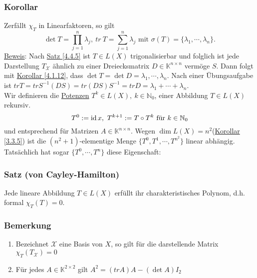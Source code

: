 \subsubsection{Korollar}
Zerfällt $\chi _T$ in Linearfaktoren, so gilt
\[\det T=\prod _{j=1}^n \lambda _j,\ tr\ T=\sum _{j=1}^n \lambda _j\text{ mit }\sigma (T)=\{\lambda _1,\cdots ,\lambda _n\}.\]
\underline{Beweis}:  Nach \hyperref[4.4.5]{Satz \ref{4.4.5}} ist $T\in L(X)$ trigonalisierbar und folglich ist jede Darstellung $T_\mathcal{X}$ ähnlich zu einer Dreiecksmatrix $D\in \mathbb{K}^{n\times n}$ vermöge $S$.  Dann folgt mit \hyperref[4.1.12]{Korollar \ref{4.1.12}}, dass $\det T=\det D=\lambda _1,\cdots ,\lambda _n$.  Nach einer Übungsaufgabe ist $trT=trS^{-1}(DS)=tr(DS)S^{-1}=trD=\lambda _1+\cdots +\lambda _n$.\\
Wir definieren die \underline{Potenzen} $T^k\in L(X),\ k\in\mathbb{N}_0$, einer Abbildung $T\in L(X)$ rekursiv.
\[T^0:=\operatorname{id} x,\ T^{k+1}:=T\circ T^k\text{ für }k\in\mathbb{N}_0\]
und entsprechend für Matrizen $A\in \mathbb{K}^{n\times n}$.  Wegen $\dim L(X)=n^2$(\hyperref[3.3.5]{Korollar \ref{3.3.5}}) ist die $(n^2+1)$-elementige Menge $\{T^0, T^1,\cdots ,T^{n^2}\}$ linear abhängig.  Tatsächlich hat sogar $\{T^0,\cdots ,T^n\}$ diese Eigenschaft:
\subsubsection{Satz (von Cayley-Hamilton)}
Jede lineare Abbildung $T\in L(X)$ erfüllt ihr charakteristisches Polynom, d.h. formal $\chi _T(T)=0$.
\subsubsection{Bemerkung}
\begin{enumerate}
\item Bezeichnet $\mathcal{X}$ eine Basis von $X$, so gilt für die darstellende Matrix $\chi _T(T_\mathcal{X})=0$
\item Für jedes $A\in\mathbb{K}^{2\times 2}$ gilt $A^2=(trA)A-(\det A)I_2$
\end{enumerate}